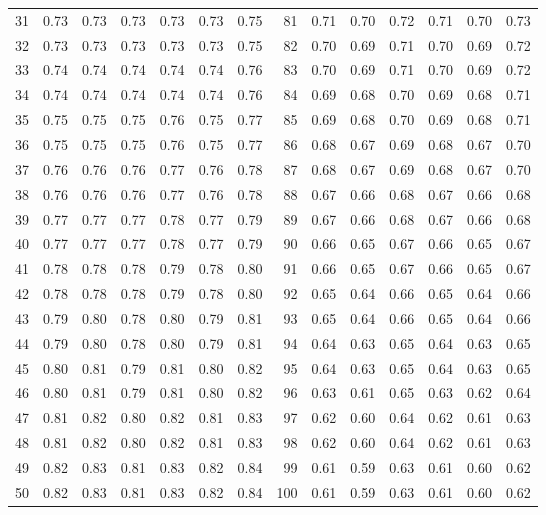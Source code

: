 \documentclass[11pt,a4paper]{article}
\begin{document}
\begin{table}[htbp]
\begin{tabular}{rllllll@{\hspace{8pt}}rllllll}
31 & 0.73 & 0.73 & 0.73 & 0.73 & 0.73 & 0.75 & 81 & 0.71 & 0.70 & 0.72 & 0.71 & 0.70 & 0.73 \\
32 & 0.73 & 0.73 & 0.73 & 0.73 & 0.73 & 0.75 & 82 & 0.70 & 0.69 & 0.71 & 0.70 & 0.69 & 0.72 \\
33 & 0.74 & 0.74 & 0.74 & 0.74 & 0.74 & 0.76 & 83 & 0.70 & 0.69 & 0.71 & 0.70 & 0.69 & 0.72 \\
34 & 0.74 & 0.74 & 0.74 & 0.74 & 0.74 & 0.76 & 84 & 0.69 & 0.68 & 0.70 & 0.69 & 0.68 & 0.71 \\
35 & 0.75 & 0.75 & 0.75 & 0.76 & 0.75 & 0.77 & 85 & 0.69 & 0.68 & 0.70 & 0.69 & 0.68 & 0.71 \\
36 & 0.75 & 0.75 & 0.75 & 0.76 & 0.75 & 0.77 & 86 & 0.68 & 0.67 & 0.69 & 0.68 & 0.67 & 0.70 \\
37 & 0.76 & 0.76 & 0.76 & 0.77 & 0.76 & 0.78 & 87 & 0.68 & 0.67 & 0.69 & 0.68 & 0.67 & 0.70 \\
38 & 0.76 & 0.76 & 0.76 & 0.77 & 0.76 & 0.78 & 88 & 0.67 & 0.66 & 0.68 & 0.67 & 0.66 & 0.68 \\
39 & 0.77 & 0.77 & 0.77 & 0.78 & 0.77 & 0.79 & 89 & 0.67 & 0.66 & 0.68 & 0.67 & 0.66 & 0.68 \\
40 & 0.77 & 0.77 & 0.77 & 0.78 & 0.77 & 0.79 & 90 & 0.66 & 0.65 & 0.67 & 0.66 & 0.65 & 0.67 \\
41 & 0.78 & 0.78 & 0.78 & 0.79 & 0.78 & 0.80 & 91 & 0.66 & 0.65 & 0.67 & 0.66 & 0.65 & 0.67 \\
42 & 0.78 & 0.78 & 0.78 & 0.79 & 0.78 & 0.80 & 92 & 0.65 & 0.64 & 0.66 & 0.65 & 0.64 & 0.66 \\
43 & 0.79 & 0.80 & 0.78 & 0.80 & 0.79 & 0.81 & 93 & 0.65 & 0.64 & 0.66 & 0.65 & 0.64 & 0.66 \\
44 & 0.79 & 0.80 & 0.78 & 0.80 & 0.79 & 0.81 & 94 & 0.64 & 0.63 & 0.65 & 0.64 & 0.63 & 0.65 \\
45 & 0.80 & 0.81 & 0.79 & 0.81 & 0.80 & 0.82 & 95 & 0.64 & 0.63 & 0.65 & 0.64 & 0.63 & 0.65 \\
46 & 0.80 & 0.81 & 0.79 & 0.81 & 0.80 & 0.82 & 96 & 0.63 & 0.61 & 0.65 & 0.63 & 0.62 & 0.64 \\
47 & 0.81 & 0.82 & 0.80 & 0.82 & 0.81 & 0.83 & 97 & 0.62 & 0.60 & 0.64 & 0.62 & 0.61 & 0.63 \\
48 & 0.81 & 0.82 & 0.80 & 0.82 & 0.81 & 0.83 & 98 & 0.62 & 0.60 & 0.64 & 0.62 & 0.61 & 0.63 \\
49 & 0.82 & 0.83 & 0.81 & 0.83 & 0.82 & 0.84 & 99 & 0.61 & 0.59 & 0.63 & 0.61 & 0.60 & 0.62 \\
50 & 0.82 & 0.83 & 0.81 & 0.83 & 0.82 & 0.84 & 100 & 0.61 & 0.59 & 0.63 & 0.61 & 0.60 & 0.62 \\
\bottomrule
\end{tabular}
\end{table}
\end{document}

